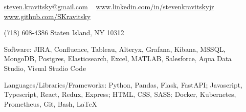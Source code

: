 \documentclass[10pt,letterpaper]{article}
\begin{document}
\sloppy  %

\nobreakvspace{0.3em}

\noindent
\href{mailto:steven.kravitsky@gmail.com}{steven.kravitsky\mbox{}@\mbox{}gmail.com} \ \faEnvelopeO
\sbull
\href{https://www.linkedin.com/in/stevenkravitskyjr}{www.linkedin.com/in/stevenkravitskyjr} \ \faLinkedinSquare
\sbull
\href{https://github.com/SKravitsky}{www.github.com/SKravitsky} \ \faGithub

\noindent
(718) 608-4386
\sbull
Staten Island, NY 10312
\sbull

\spacedhrule{0.9em}{-0.4em}  %


\inlineheadsection  %
  {Software:}
  {JIRA, Confluence, Tableau, Alteryx, Grafana, Kibana, MSSQL, MongoDB, Postgres, Elasticsearch, Excel, MATLAB, Salesforce, Aqua Data Studio, Visual Studio Code}

\vspace{0.1em}
\inlineheadsection
  {Languages/Libraries/Frameworks:}
  {Python, Pandas, Flask, FastAPI; Javascript, Typescript, React, Redux, Express; HTML, CSS, SASS; Docker, Kubernetes, Prometheus, Git, Bash, LaTeX}

\spacedhrule{1.8em}{-0.4em}

\end{document}
